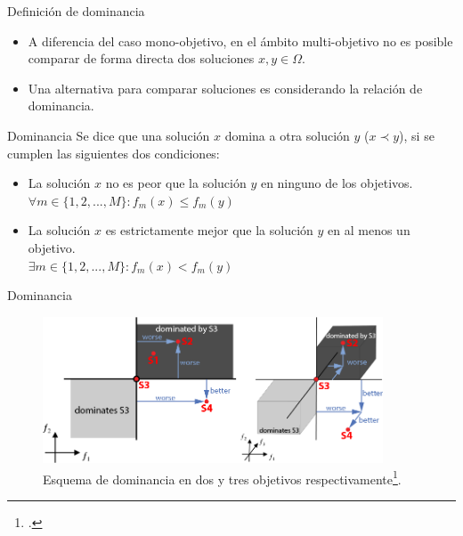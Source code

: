 \documentclass{beamer}
\begin{document}
\begin{frame}{Definición de dominancia}
\justifying
\begin{itemize}
\justifying
    \item A diferencia del caso mono-objetivo, en el ámbito multi-objetivo no es posible comparar de forma directa dos soluciones $x, y \in \Omega$.
    \item Una alternativa para comparar soluciones es considerando la relación de dominancia.
\end{itemize}
\begin{mydef}{Dominancia}{}
\scriptsize
Se dice que una solución $x$ domina a otra solución $y$ ($x \prec y$), si se cumplen las siguientes dos condiciones:
    \begin{itemize}
        \item La solución $x$ no es peor que la solución $y$ en ninguno de los objetivos.\\
$\forall m \in \{ 1, 2, ..., M \}: f_m(x) \leq f_m(y)$
\justifying
        \item La solución $x$ es estrictamente mejor que la solución $y$ en al menos un objetivo.\\
$\exists m \in \{ 1, 2, ..., M \}: f_m(x) < f_m(y)$
    \end{itemize}
\end{mydef}
\end{frame}

\begin{frame}{Dominancia}
\begin{figure}[H]
\centering
\includegraphics[width=0.9\textwidth]{Images/dominance_scheme.png}
\caption{\scriptsize Esquema de dominancia en dos y tres objetivos respectivamente\footcite{WinNT}.}
\end{figure}
\end{frame}
\end{document}
